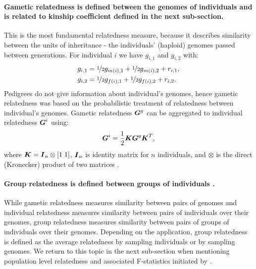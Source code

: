 \paragraph{Gametic relatedness is defined between the genomes of individuals
\citep{smith1985efficient, schaeffer1989inverse} and is related to
kinship coefficient defined in the next sub-section.}
%
This is the most fundamental relatedness measure, because it
describes similarity between the units of inheritance - the individuals'
(haploid) genomes passed between generations.
%
For individual $i$ we have $g_{i,1}$ and $g_{i,2}$ with:
%
\begin{align} \label{eqn:wright_gamete}
    g_{i,1} & = \nicefrac{1}{2}g_{m(i),1} + \nicefrac{1}{2}g_{m(i),2} + r_{i,1},\\
    g_{i,2} & = \nicefrac{1}{2}g_{f(i),1} + \nicefrac{1}{2}g_{f(i),2} + r_{i,2}. \notag
\end{align}
%
Pedigrees do not give information about individual's genomes, hence gametic
relatedness was based on the probabilistic treatment of relatedness between
individual's genomes.
%
Gametic relatedness $\boldsymbol{G}^{g}$ can be aggregated to individual
relatedness $\boldsymbol{G}^{i}$ using:
%
\begin{equation} \label{eqn:G_ped_ind_from_gam}
  \boldsymbol{G}^{i} = \frac{1}{2}\boldsymbol{K} \boldsymbol{G}^{g} \boldsymbol{K}^T,
\end{equation}
%
where
$\boldsymbol{K} = \boldsymbol{I}_n \otimes [1\;1]$,
$\boldsymbol{I}_n$ is identity matrix for $n$ individuals, and
$\otimes$ is the direct (Kronecker) product of two matrices
\citep{smith1985efficient}.

\paragraph{Group relatedness is defined between groups of individuals
\citep{wright1949genetical, jacquard1975inbreeding, cockerham1976group}.}
%
While gametic relatedness measures similarity between pairs of genomes and
individual relatedness measures similarity between pairs of
individuals over their genomes, group relatedness measures similarity
between pairs of groups of individuals over their genomes.
%
Depending on the application, group relatedness is defined as the average
relatedness by sampling individuals or by sampling genomes.
%
We return to this topic in the next sub-section when mentioning population
level relatedness and associated F-statistics initiated by
\cite{wright1949genetical}.

